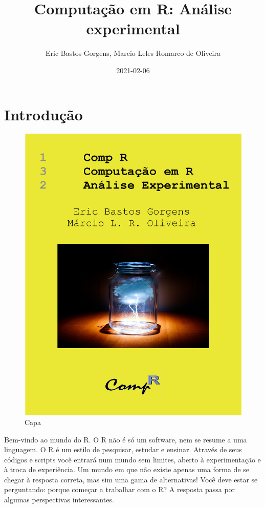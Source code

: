 \documentclass[
]{article}
\title{Computação em R: Análise experimental}
\author{Eric Bastos Gorgens, Marcio Leles Romarco de Oliveira}
\date{2021-02-06}
\begin{document}
\maketitle

{
\setcounter{tocdepth}{2}
\tableofcontents
}
\hypertarget{introduuxe7uxe3o}{%
\section{Introdução}\label{introduuxe7uxe3o}}

\begin{figure}
\centering
\includegraphics{./figuras/capa.png}
\caption{Capa}
\end{figure}

Bem-vindo ao mundo do R. O R não é só um software, nem se resume a uma linguagem. O R é um estilo de pesquisar, estudar e ensinar. Através de seus códigos e scripts você entrará num mundo sem limites, aberto à experimentação e à troca de experiência. Um mundo em que não existe apenas uma forma de se chegar à resposta correta, mas sim uma gama de alternativas! Você deve estar se perguntando: porque começar a trabalhar com o R? A resposta passa por algumas perspectivas interessantes.
\end{document}
